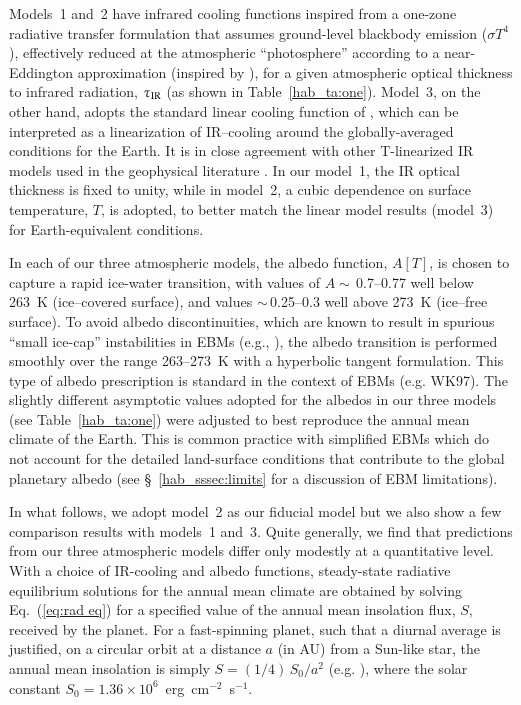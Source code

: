 Models~1 and~2 have infrared cooling functions inspired from a
one-zone radiative transfer formulation that assumes ground-level
blackbody emission ($\sigma T^4$), effectively reduced at the
atmospheric ``photosphere'' according to a near-Eddington
approximation (inspired by \citet{shu1982}), for a given atmospheric
optical thickness to infrared radiation, $\tau_{\rm IR}$ (as shown in
Table~\ref{hab_ta:one}). Model~3, on the other hand, adopts the
standard linear cooling function of \citet{north+coakley1979}, which
can be interpreted as a linearization of IR--cooling around the
globally-averaged conditions for the Earth.  It is in close agreement
with other T-linearized IR models used in the geophysical literature
\citep[e.g.,][]{budyko1969,north_et_al1981}. In our model~1, the IR
optical thickness is fixed to unity, while in model~2, a cubic
dependence on surface temperature, $T$, is adopted, to better match
the linear model results (model~3) for Earth-equivalent conditions.

In each of our three atmospheric models, the albedo function, $A[T]$,
is chosen to capture a rapid ice-water transition, with values of $A
\sim $\,0.7--0.77 well below 263~K (ice--covered surface), and values
$\sim $\,0.25--0.3 well above 273~K (ice--free surface). To avoid
albedo discontinuities, which are known to result in spurious ``small
ice-cap'' instabilities in EBMs (e.g., \citet{held_et_al1981}), the
albedo transition is performed smoothly over the range 263--273~K with
a hyperbolic tangent formulation. This type of albedo prescription is
standard in the context of EBMs (e.g. WK97). The slightly different
asymptotic values adopted for the albedos in our three models (see
Table~\ref{hab_ta:one}) were adjusted to best reproduce the annual
mean climate of the Earth. This is common practice with simplified
EBMs which do not account for the detailed land-surface conditions
that contribute to the global planetary albedo (see
\S~\ref{hab_sssec:limits} for a discussion of EBM limitations).

In what follows, we adopt model~2 as our fiducial model but we also
show a few comparison results with models~1 and~3. Quite generally, we
find that predictions from our three atmospheric models differ only
modestly at a quantitative level. With a choice of IR-cooling and
albedo functions, steady-state radiative equilibrium solutions for the
annual mean climate are obtained by solving Eq.~(\ref{eq:rad eq}) for
a specified value of the annual mean insolation flux, $S$, received by
the planet. For a fast-spinning planet, such that a diurnal average is
justified, on a circular orbit at a distance $a$ (in AU) from a
Sun-like star, the annual mean insolation is simply $S=(1/4) \,
S_0/a^2$ (e.g. \citealt{rubincam2004}), where the solar constant
$S_0=1.36 \times 10^6$~erg~cm$^{-2}$~s$^{-1}$.

